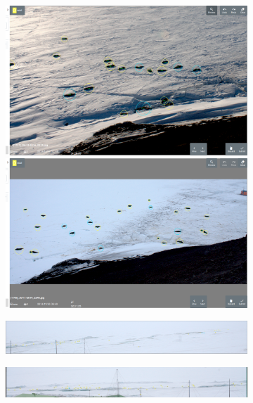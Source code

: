\begin{figure}[h!]
\centering
\begin{subfigure}[t]{1.0\linewidth}
  \includegraphics[width=0.475\linewidth]{figures/annotation/screenshots/seals_small2.png}
  \hfill
  \includegraphics[width=0.475\linewidth]{figures/annotation/screenshots/seals_small.png}
  \caption{}
\end{subfigure}

\begin{subfigure}[t]{1.0\linewidth}
  \includegraphics[width=1.0\linewidth]{figures/annotation/screenshots/cam_c.png}
\end{subfigure}

\begin{subfigure}[t]{1.0\linewidth}

  \includegraphics[width=1.0\linewidth]{figures/annotation/screenshots/cam_b.png}
  \caption{}
\end{subfigure}



\caption{ }
\label {fig:weddell_images}
\end{figure}



